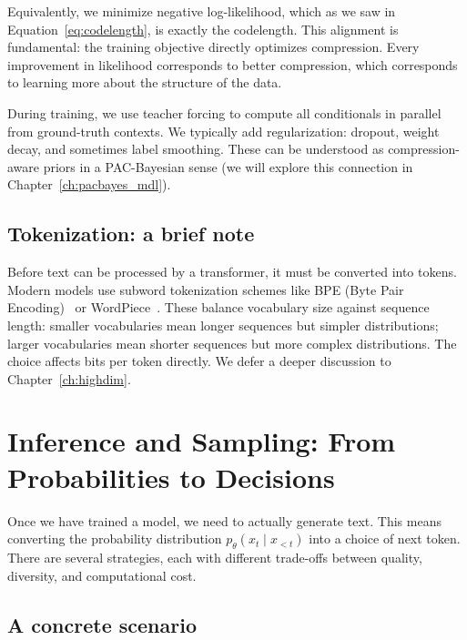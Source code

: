Equivalently, we minimize negative log-likelihood, which as we saw in Equation~\eqref{eq:codelength}, is exactly the codelength. This alignment is fundamental: the training objective directly optimizes compression. Every improvement in likelihood corresponds to better compression, which corresponds to learning more about the structure of the data.

During training, we use teacher forcing to compute all conditionals in parallel from ground-truth contexts. We typically add regularization: dropout, weight decay, and sometimes label smoothing. These can be understood as compression-aware priors in a PAC-Bayesian sense (we will explore this connection in Chapter~\ref{ch:pacbayes_mdl}).

\subsection{Tokenization: a brief note}
\label{sec:tokenization}

Before text can be processed by a transformer, it must be converted into tokens. Modern models use subword tokenization schemes like BPE (Byte Pair Encoding)~\citep{sennrich2016bpe} or WordPiece~\citep{schuster2012wordpiece}. These balance vocabulary size against sequence length: smaller vocabularies mean longer sequences but simpler distributions; larger vocabularies mean shorter sequences but more complex distributions. The choice affects bits per token directly. We defer a deeper discussion to Chapter~\ref{ch:highdim}.

\vspace{1.2em}

\section{Inference and Sampling: From Probabilities to Decisions}
\label{sec:inference_sampling}

Once we have trained a model, we need to actually generate text. This means converting the probability distribution $p_\theta(x_t\mid x_{<t})$ into a choice of next token. There are several strategies, each with different trade-offs between quality, diversity, and computational cost.

\subsection{A concrete scenario}
\label{sec:sampling_scenario}

